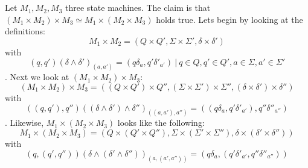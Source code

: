 \documentclass[a4paper,12pt,numbers=noenddot]{scrreport}
\begin{document}
\section{}
Let $M_1, M_2, M_3$ three state machines. The claim is that $(M_1 \times M_2) \times M_3 \simeq M_1 \times (M_2 \times M_3)$ holds true. 
Lets begin by looking at the definitions:\\
\begin{equation}
    M_1 \times M_2 = (Q \times Q', \Sigma \times \Sigma', \delta \times \delta')
\end{equation}
with 
\begin{equation}
    (q, q')(\delta \land \delta')_{(a, a')} = (q\delta_a, q'\delta'_{a'}) ~|~ q \in Q, q' \in Q', a \in \Sigma, a' \in \Sigma' 
\end{equation}
. Next we look at $(M_1 \times M_2) \times M_3$:\\
\begin{equation}
    (M_1 \times M_2) \times M_3 = ((Q \times Q')\times Q'', (\Sigma \times \Sigma') \times \Sigma'', (\delta \times \delta') \times \delta'') 
\end{equation}
with 
\begin{equation}
    ((q, q'), q'')((\delta \land \delta')\land \delta'')_{((a, a'), a'')} = ((q\delta_a, q'\delta'_{a'}), q''\delta''_{a''} )
\end{equation}
. Likewise, $M_1 \times (M_2 \times M_3)$ looks like the following:
\begin{equation}
    M_1 \times (M_2 \times M_3) = (Q \times (Q' \times Q''), \Sigma \times (\Sigma' \times \Sigma''), \delta \times (\delta' \times \delta''))
\end{equation}
with 
\begin{equation}
    (q, (q', q''))(\delta \land (\delta' \land \delta''))_{(a, (a' , a''))} = (q\delta_a, (q'\delta'_{a'} , q''\delta''_{a''}))
\end{equation}
\end{document}
